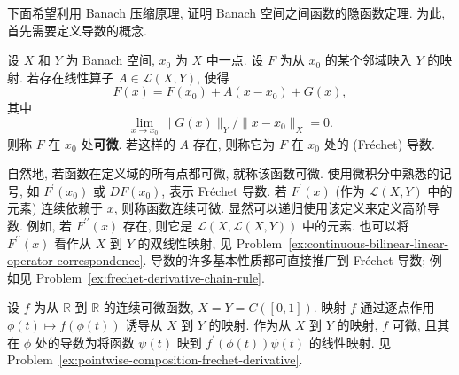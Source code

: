 下面希望利用 Banach 压缩原理, 证明 Banach 空间之间函数的隐函数定理. 为此, 首先需要定义导数的概念.

\begin{Definition}
\label{def:frechet-derivative}
设 $X$ 和 $Y$ 为 Banach 空间, $x_0$ 为 $X$ 中一点. 设 $F$ 为从 $x_0$ 的某个邻域映入 $Y$ 的映射. 若存在线性算子 $A\in\mathcal{L}(X,Y)$, 使得
\begin{equation}\label{eq:frechet-differentiability-linear-remainder-expansion}
F(x)=F(x_0)+A(x-x_0)+G(x),
\end{equation}
其中
\begin{equation}\label{eq:frechet-differentiability-vanishing-relative-remainder}
\lim_{x\to x_0}\|G(x)\|_Y/\|x-x_0\|_X=0.
\end{equation}
则称 $F$ 在 $x_0$ 处\textbf{可微}. 若这样的 $A$ 存在, 则称它为 $F$ 在 $x_0$ 处的 (Fréchet) 导数.
\end{Definition}

自然地, 若函数在定义域的所有点都可微, 就称该函数可微. 使用微积分中熟悉的记号, 如 $F^{\prime}(x_0)$ 或 $DF(x_0)$, 表示 Fréchet 导数. 若 $F^{\prime}(x)$ (作为 $\mathcal{L}(X,Y)$ 中的元素) 连续依赖于 $x$, 则称函数连续可微. 显然可以递归使用该定义来定义高阶导数. 例如, 若 $F^{\prime\prime}(x)$ 存在, 则它是 $\mathcal{L}(X,\mathcal{L}(X,Y))$ 中的元素. 也可以将 $F^{\prime\prime}(x)$ 看作从 $X$ 到 $Y$ 的双线性映射, 见 Problem~\ref{ex:continuous-bilinear-linear-operator-correspondence}. 导数的许多基本性质都可直接推广到 Fréchet 导数; 例如见 Problem~\ref{ex:frechet-derivative-chain-rule}.

\begin{Example}
\label{ex:pointwise-composition-frechet-derivative-example}
设 $f$ 为从 $\mathbb{R}$ 到 $\mathbb{R}$ 的连续可微函数, $X=Y=C([0,1])$. 映射 $f$ 通过逐点作用 $\phi(t)\mapsto f(\phi(t))$ 诱导从 $X$ 到 $Y$ 的映射. 作为从 $X$ 到 $Y$ 的映射, $f$ 可微, 且其在 $\phi$ 处的导数为将函数 $\psi(t)$ 映到 $f^{\prime}(\phi(t))\psi(t)$ 的线性映射. 见 Problem~\ref{ex:pointwise-composition-frechet-derivative}.
\end{Example}
